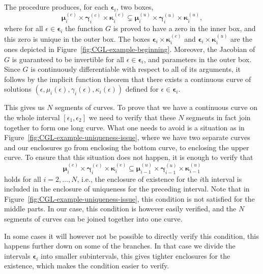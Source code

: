 \documentclass[11pt]{article}
\newcommand{\inter}[1]{\bm{#1}}
\begin{document}
The procedure produces, for each \(\inter{\epsilon}_{i}\), two boxes,
\begin{equation*}
  \inter{\mu}_{i}^{(e)} \times \inter{\gamma}_{i}^{(e)} \times \inter{\kappa}_{i}^{(e)}
  \subsetneq
  \inter{\mu}_{i}^{(u)} \times \inter{\gamma}_{i}^{(u)} \times \inter{\kappa}_{i}^{(u)},
\end{equation*}
where for all \(\epsilon \in \inter{\epsilon}_{i}\) the function \(G\)
is proved to have a zero in the inner box, and this zero is unique in
the outer box. The boxes
\(\inter{\epsilon}_{i} \times \inter{\kappa}_{i}^{(e)}\) and
\(\inter{\epsilon}_{i} \times \inter{\kappa}_{i}^{(u)}\) are the ones
depicted in Figure~\ref{fig:CGL-example-beginning}. Moreover, the
Jacobian of \(G\) is guaranteed to be invertible for all
\(\epsilon \in \inter{\epsilon}_{i}\), and parameters in the outer
box. Since \(G\) is continuously differentiable with respect to all of
its arguments, it follows by the implicit function theorem that there
exists a continuous curve of solutions
\((\epsilon, \mu_{i}(\epsilon), \gamma_{i}(\epsilon),
\kappa_{i}(\epsilon))\) defined for
\(\epsilon \in \inter{\epsilon}_{i}\).

This gives us \(N\) segments of curves. To prove that we have a
continuous curve on the whole interval \([\epsilon_1, \epsilon_2]\) we
need to verify that these \(N\) segments in fact join together to form
one long curve. What one needs to avoid is a situation as in
Figure~\ref{fig:CGL-example-uniqueness-issue}, where we have two
separate curves and our enclosures go from enclosing the bottom curve,
to enclosing the upper curve. To ensure that this situation does not
happen, it is enough to verify that
\begin{equation*}
  \inter{\mu}_{i}^{(e)} \times \inter{\gamma}_{i}^{(e)} \times \inter{\kappa}_{i}^{(e)}
  \subseteq
  \inter{\mu}_{i - 1}^{(u)} \times \inter{\gamma}_{i - 1}^{(u)} \times \inter{\kappa}_{i - 1}^{(u)}
\end{equation*}
holds for all \(i = 2, \dots, N\), i.e., the enclosure of existence
for the \(i\)th interval is included in the enclosure of uniqueness
for the preceding interval. Note that in
Figure~\ref{fig:CGL-example-uniqueness-issue}, this condition is not
satisfied for the middle parts. In our case, this condition is however
easily verified, and the \(N\) segments of curves can be joined
together into one curve.

In some cases it will however not be possible to directly verify this
condition, this happens further down on some of the branches. In that
case we divide the intervals \(\inter{\epsilon}_i\) into smaller
subintervals, this gives tighter enclosures for the existence, which
makes the condition easier to verify.
\end{document}
